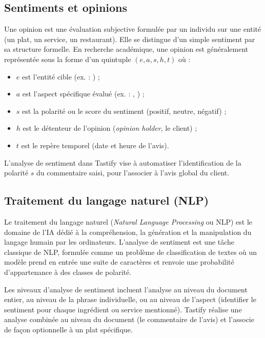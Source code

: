 \subsection{Sentiments et opinions}
Une opinion est une évaluation subjective formulée par un individu sur une entité (un plat, un service, un restaurant). Elle se distingue d'un simple sentiment par sa structure formelle. En recherche académique, une opinion est généralement représentée sous la forme d'un quintuple $(e, a, s, h, t)$ où :
\begin{itemize}
    \item $e$ est l'entité cible (ex. : ) ;
    \item $a$ est l'aspect spécifique évalué (ex. : , ) ;
    \item $s$ est la polarité ou le score du sentiment (positif, neutre, négatif) ;
    \item $h$ est le détenteur de l'opinion (\textit{opinion holder}, le client) ;
    \item $t$ est le repère temporel (date et heure de l'avis).
\end{itemize}

L'analyse de sentiment dans Tastify vise à automatiser l'identification de la polarité $s$ du commentaire saisi, pour l'associer à l'avis global du client.

\subsection{Traitement du langage naturel (NLP)}
Le traitement du langage naturel (\textit{Natural Language Processing} ou NLP) est le domaine de l'IA dédié à la compréhension, la génération et la manipulation du langage humain par les ordinateurs. L'analyse de sentiment est une tâche classique de NLP, formulée comme un problème de classification de textes où un modèle prend en entrée une suite de caractères et renvoie une probabilité d'appartenance à des classes de polarité.

Les niveaux d'analyse de sentiment incluent l'analyse au niveau du document entier, au niveau de la phrase individuelle, ou au niveau de l'aspect (identifier le sentiment pour chaque ingrédient ou service mentionné). Tastify réalise une analyse combinée au niveau du document (le commentaire de l'avis) et l'associe de façon optionnelle à un plat spécifique.

